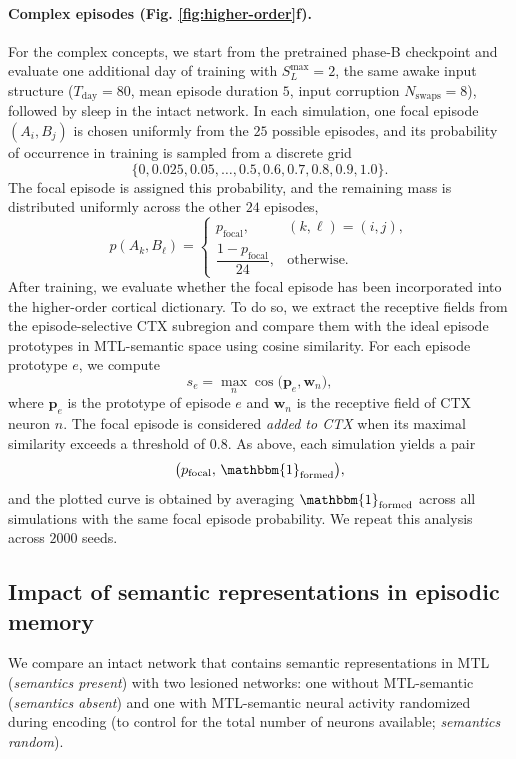 \documentclass{article}
\begin{document}
\paragraph*{Complex episodes (Fig. \ref{fig:higher-order}f).}
For the complex concepts, we start from the pretrained phase-B checkpoint and evaluate one additional day of training with $S_L^\textrm{max}=2$, the same awake input structure ($T_{\mathrm{day}}=80$, mean episode duration $5$, input corruption $N_{\mathrm{swaps}}=8$), followed by sleep in the intact network. In each simulation, one focal episode $(A_i,B_j)$ is chosen uniformly from the $25$ possible episodes, and its probability of occurrence in training is sampled from a discrete grid
\[
\{0,0.025,0.05,\dots,0.5,0.6,0.7,0.8,0.9,1.0\}.
\]
The focal episode is assigned this probability, and the remaining mass is distributed uniformly across the other $24$ episodes,
\begin{equation}
p(A_k,B_\ell)=
\begin{cases}
p_{\mathrm{focal}}, & (k,\ell)=(i,j),\\[4pt]
\dfrac{1-p_{\mathrm{focal}}}{24}, & \text{otherwise.}
\end{cases}
\end{equation}
After training, we evaluate whether the focal episode has been incorporated into the higher-order cortical dictionary. To do so, we extract the receptive fields from the episode-selective CTX subregion and compare them with the ideal episode prototypes in MTL-semantic space using cosine similarity. For each episode prototype $e$, we compute
\begin{equation}
s_e=\max_n \cos\!\big(\mathbf{p}_e,\mathbf{w}_n\big),
\end{equation}
where $\mathbf{p}_e$ is the prototype of episode $e$ and $\mathbf{w}_n$ is the receptive field of CTX neuron $n$. The focal episode is considered \emph{added to CTX} when its maximal similarity exceeds a threshold of $0.8$. As above, each simulation yields a pair
\begin{equation}
\big(p_{\mathrm{focal}},\, \mathbbm{1}_{\mathrm{formed}}\big),
\end{equation}
and the plotted curve is obtained by averaging $\mathbbm{1}_{\mathrm{formed}}$ across all simulations with the same focal episode probability. We repeat this analysis across $2000$ seeds.
\subsection*{Impact of semantic representations in episodic memory}
We compare an intact network that contains semantic representations in MTL (\emph{semantics present}) with two lesioned networks: one without MTL-semantic (\emph{semantics absent}) and one with MTL-semantic neural activity randomized during encoding (to control for the total number of neurons available; \emph{semantics random}).
\end{document}
